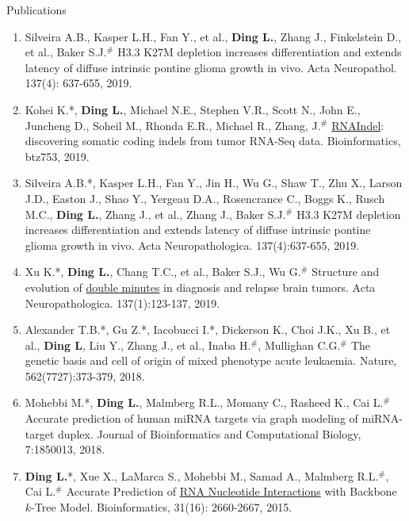 \documentclass{resume} %
\begin{document}
\begin{rSection}{Publications}
\begin{enumerate}
\item Silveira A.B., Kasper L.H., Fan Y., et al., \textbf{Ding L.}, Zhang J., Finkelstein D., et al., Baker S.J.$^{\#}$ H3.3 K27M depletion increases differentiation and extends latency of diffuse intrinsic pontine glioma growth in vivo. Acta Neuropathol. 137(4): 637-655, 2019.

\item Kohei K.*, \textbf{Ding L.}, Michael N.E., Stephen V.R., Scott N., John E., Juncheng D., Soheil M., Rhonda E.R., Michael R., Zhang, J.$^{\#}$ \href{https://github.com/stjude/RNAIndel}{RNAIndel}: discovering somatic coding indels from tumor RNA-Seq data. Bioinformatics, btz753, 2019.

\item Silveira A.B.*, Kasper L.H., Fan Y., Jin H., Wu G., Shaw T., Zhu X., Larson J.D., Easton J., Shao Y., Yergeau D.A., Rosencrance C., Boggs K., Rusch M.C., \textbf{Ding L.}, Zhang J., et al., Zhang J., Baker S.J.$^{\#}$ H3.3 K27M depletion increases differentiation and extends latency of diffuse intrinsic pontine glioma growth in vivo. Acta Neuropathologica. 137(4):637-655, 2019.

\item Xu K.*, \textbf{Ding L.}, Chang T.C., et al., Baker S.J., Wu G.$^{\#}$ Structure and evolution of \href{https://link.springer.com/article/10.1007/s00401-018-1912-1}{double minutes} in diagnosis and relapse brain tumors. Acta Neuropathologica. 137(1):123-137, 2019.

\item Alexander T.B.*, Gu Z.*, Iacobucci I.*, Dickerson K., Choi J.K., Xu B., et al., \textbf{Ding L}, Liu Y., Zhang J., et al., Inaba H.$^{\#}$, Mullighan C.G.$^{\#}$ The genetic basis and cell of origin of mixed phenotype acute leukaemia. Nature, 562(7727):373-379, 2018.

\item Mohebbi M.*, \textbf{Ding L.}, Malmberg R.L., Momany C., Rasheed K., Cai L.$^{\#}$ Accurate prediction of human miRNA targets via graph modeling of miRNA-target duplex. Journal of Bioinformatics and Computational Biology, 7:1850013, 2018.

\item \textbf{Ding L.}*, Xue X., LaMarca S., Mohebbi M., Samad A., Malmberg R.L.$^{\#}$, Cai L.$^{\#}$ Accurate Prediction of \href{https://academic.oup.com/bioinformatics/article/31/16/2660/321332}{RNA Nucleotide Interactions} with Backbone $k$-Tree Model. Bioinformatics, 31(16): 2660-2667, 2015.
\end{enumerate}



\end{rSection}
\end{document}
